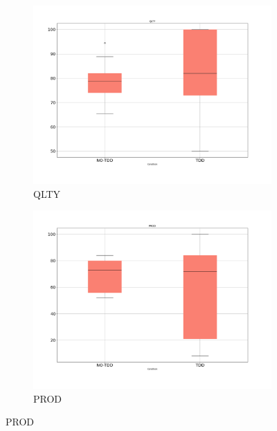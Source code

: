 \begin{figure}[htbp]
    \centering
    \begin{subfigure}{0.5\textwidth}
        \includegraphics[width=\linewidth]{figures/box_plots/task1_2/QLTY.png}
        \caption{QLTY}
        \label{bp_task1_2_qlty}
    \end{subfigure}\hfil
    \begin{subfigure}{0.5\textwidth}
        \includegraphics[width=\linewidth]{figures/box_plots/task1_2/PROD.png}
        \caption{PROD}
        \label{bp_task1_2_prod}
    \end{subfigure}

    \medskip


\end{figure}
